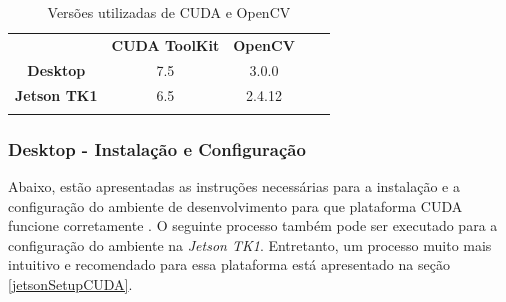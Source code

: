 \begin{table}[]
\centering
\caption{Versões utilizadas de CUDA e OpenCV}
\label{cudaopencv}
\begin{tabular}{cccll}
                     & \textbf{CUDA ToolKit}	     & \textbf{OpenCV} 	       &  &  \\
\textbf{Desktop}     & 7.5                           & 3.0.0                   &  &  \\
\textbf{Jetson TK1}  & 6.5                           & 2.4.12                  &  &  \\
\multicolumn{1}{l}{} & \multicolumn{1}{l}{}          & \multicolumn{1}{l}{}    &  & 
\end{tabular}
\end{table}

\subsubsection{Desktop - Instalação e Configuração}
Abaixo, estão apresentadas as instruções necessárias para a instalação e a configuração do ambiente de desenvolvimento para que plataforma CUDA funcione corretamente \cite{FacebookCUDA}. O seguinte processo também pode ser executado para a configuração do ambiente na \textit{Jetson TK1}. Entretanto, um processo muito mais intuitivo e recomendado para essa plataforma está apresentado na seção \ref{jetsonSetupCUDA}.


